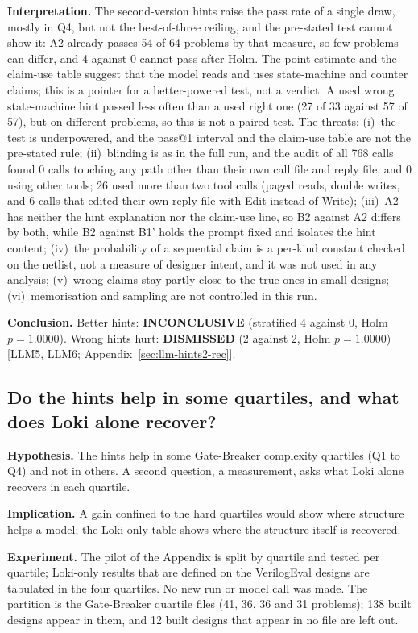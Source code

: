 \documentclass[conference]{IEEEtran}
\newcommand{\verdict}[1]{\textbf{\textsc{#1}}}
\newcommand{\hev}[1]{\par\smallskip\noindent\textbf{#1}}
\begin{document}
\hev{Interpretation.} The second-version hints raise the pass rate of a single draw, mostly in Q4, but not the best-of-three ceiling, and the pre-stated test cannot show it: A2 already passes 54 of 64 problems by that measure, so few problems can differ, and 4 against 0 cannot pass after Holm. The point estimate and the claim-use table suggest that the model reads and uses state-machine and counter claims; this is a pointer for a better-powered test, not a verdict. A used wrong state-machine hint passed less often than a used right one (27 of 33 against 57 of 57), but on different problems, so this is not a paired test. The threats: (i)~the test is underpowered, and the pass@1 interval and the claim-use table are not the pre-stated rule; (ii)~blinding is as in the full run, and the audit of all 768 calls found 0 calls touching any path other than their own call file and reply file, and 0 using other tools; 26 used more than two tool calls (paged reads, double writes, and 6 calls that edited their own reply file with Edit instead of Write); (iii)~A2 has neither the hint explanation nor the claim-use line, so B2 against A2 differs by both, while B2 against B1' holds the prompt fixed and isolates the hint content; (iv)~the probability of a sequential claim is a per-kind constant checked on the netlist, not a measure of designer intent, and it was not used in any analysis; (v)~wrong claims stay partly close to the true ones in small designs; (vi)~memorisation and sampling are not controlled in this run.

\hev{Conclusion.} Better hints: \verdict{INCONCLUSIVE} (stratified 4 against 0, Holm $p=1.0000$). Wrong hints hurt: \verdict{DISMISSED} (2 against 2, Holm $p=1.0000$) [LLM5, LLM6; Appendix~\ref{sec:llm-hints2-rec}].

\subsection{Do the hints help in some quartiles, and what does Loki alone recover?}
\label{arg:la4}
\label{sec:quartiles}

\hev{Hypothesis.} The hints help in some Gate-Breaker complexity quartiles (Q1 to Q4) and not in others. A second question, a measurement, asks what Loki alone recovers in each quartile.

\hev{Implication.} A gain confined to the hard quartiles would show where structure helps a model; the Loki-only table shows where the structure itself is recovered.

\hev{Experiment.} The pilot of the Appendix is split by quartile and tested per quartile; Loki-only results that are defined on the VerilogEval designs are tabulated in the four quartiles. No new run or model call was made. The partition is the Gate-Breaker quartile files (41, 36, 36 and 31 problems); 138 built designs appear in them, and 12 built designs that appear in no file are left out.
\end{document}
